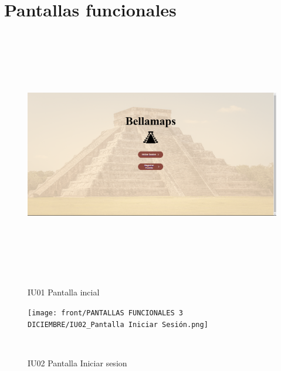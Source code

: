 \section{Pantallas funcionales}
\begin{figure}[htb]
    \begin{minipage}{1\textwidth}
    \centering
    \includegraphics[width=17cm, height=11cm]{front/PANTALLAS FUNCIONALES 3 DICIEMBRE/IU01_PantallaInicial.png}
    \caption{IU01 Pantalla incial}
\end{minipage}

    \begin{minipage}{1\textwidth}
        \centering
        \texttt{[image: front/PANTALLAS FUNCIONALES 3 DICIEMBRE/IU02\_Pantalla Iniciar Sesión.png]}
        \caption{IU02 Pantalla Iniciar sesion}
    \end{minipage}
    \\
\end{figure}
